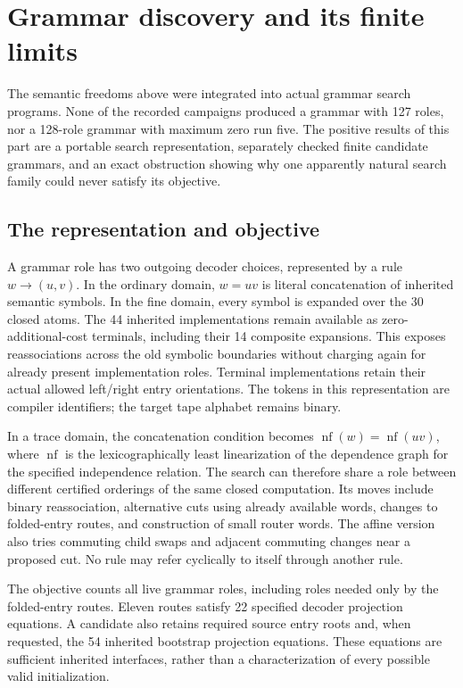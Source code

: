 \section{Grammar discovery and its finite limits}
\label{sec:grammar-search}

The semantic freedoms above were integrated into actual grammar search
programs.  None of the recorded campaigns produced a grammar with 127
roles, nor a 128-role grammar with maximum zero run five.  The positive
results of this part are a portable search representation, separately
checked finite candidate grammars, and an exact obstruction showing why
one apparently natural search family could never satisfy its objective.

\subsection{The representation and objective}

A grammar role has two outgoing decoder choices, represented by a rule
$w\to(u,v)$.  In the ordinary domain, $w=uv$ is literal concatenation of
inherited semantic symbols.  In the fine domain, every symbol is expanded
over the 30 closed atoms.  The 44 inherited implementations remain
available as zero-additional-cost terminals, including their 14 composite
expansions.  This exposes reassociations across the old symbolic
boundaries without charging again for already present implementation
roles.  Terminal implementations retain their actual allowed left/right
entry orientations.  The tokens in this representation are compiler
identifiers; the target tape alphabet remains binary.

In a trace domain, the concatenation condition becomes
$\operatorname{nf}(w)=\operatorname{nf}(uv)$, where $\operatorname{nf}$ is
the lexicographically least linearization of the dependence graph for
the specified independence relation.  The search can therefore share a
role between different certified orderings of the same closed
computation.  Its moves include binary reassociation, alternative cuts
using already available words, changes to folded-entry routes, and
construction of small router words.  The affine version also tries
commuting child swaps and adjacent commuting changes near a proposed cut.
No rule may refer cyclically to itself through another rule.

The objective counts all live grammar roles, including roles needed only
by the folded-entry routes.  Eleven routes satisfy 22 specified decoder
projection equations.  A candidate also retains required source entry
roots and, when requested, the 54 inherited bootstrap projection
equations.  These equations are sufficient inherited interfaces, rather
than a characterization of every possible valid initialization.

